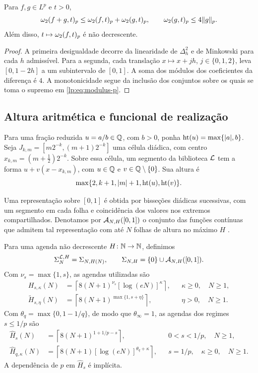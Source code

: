 \documentclass[12pt,a4paper]{article}
\begin{document}
\begin{lema}
\label{lp:lem:modulus}
Para $f,g\in L^p$ e $t>0$,
\[
 \omega_2(f+g,t)_{p}\le\omega_2(f,t)_{p}+\omega_2(g,t)_{p},
 \qquad \omega_2(g,t)_{p}\le4\|g\|_p.
\]
Além disso, $t\mapsto\omega_2(f,t)_{p}$ é não decrescente.
\end{lema}

\begin{proof}
A primeira desigualdade decorre da linearidade de $\Delta_h^2$ e de Minkowski para cada $h$ admissível. Para a segunda, cada translação $x\mapsto x+jh$, $j\in\{0,1,2\}$, leva $[0,1-2h]$ a um subintervalo de $[0,1]$. A soma dos módulos dos coeficientes da diferença é $4$. A monotonicidade segue da inclusão dos conjuntos sobre os quais se toma o supremo em \eqref{lp:eq:modulus-p}.
\end{proof}

\subsection{Altura aritmética e funcional de realização}

Para uma fração reduzida $u=a/b\in\mathbb Q$, com $b>0$, ponha
$\operatorname{ht}(u)=\max\{|a|,b\}$. Seja $J_{k,m}=[m2^{-k},(m+1)2^{-k}]$ uma célula diádica, com centro $x_{k,m}=(m+\tfrac12)2^{-k}$. Sobre essa célula, um segmento da biblioteca $\mathcal L$ tem a forma $u+v(x-x_{k,m})$, com $u\in\mathbb Q$ e $v\in\mathbb Q\setminus\{0\}$. Sua altura é
\[
 \max\{2,k+1,|m|+1,\operatorname{ht}(u),\operatorname{ht}(v)\}.
\]

Uma representação sobre $[0,1]$ é obtida por bisseções diádicas sucessivas, com um segmento em cada folha e coincidência dos valores nos extremos compartilhados. Denotamos por $\mathcal A_{N,H}([0,1])$ o conjunto das funções contínuas que admitem tal representação com até $N$ folhas de altura no máximo $H$ \citep{lp-oliveiravol}.

Para uma agenda não decrescente $H\colon\mathbb N\to\mathbb N$, definimos
\begin{equation}
 \Sigma_{N}^{\mathcal L,H}=\Sigma_{N,H(N)},\qquad \Sigma_{N,H}=\{0\}\cup\mathcal A_{N,H}([0,1]).
 \label{lp:eq:sigma}
\end{equation}
Com $\nu_s=\max\{1,s\}$, as agendas utilizadas são
\begin{align}
 H_{s,\kappa}(N)
 &=\left\lceil8(N+1)^{\nu_s}[\log(eN)]^\kappa\right\rceil,
 &&\kappa\ge0,\quad N\ge1,\label{lp:eq:schedule}\\
 \widetilde H_{s,\eta}(N)
 &=\left\lceil8(N+1)^{\max\{1,s+\eta\}}\right\rceil,
 &&\eta>0,\quad N\ge1.\label{lp:eq:slack}
\end{align}
Com $\theta_q=\max\{0,1-1/q\}$, de modo que $\theta_\infty=1$, as agendas dos regimes $s\le1/p$ são
\begin{align}
 \widehat H_{s}(N)
 &=\left\lceil8(N+1)^{1+1/p-s}\right\rceil,
 &&0<s<1/p,\quad N\ge1,\label{lp:eq:schedule-low}\\
 \widehat H_{q,\kappa}(N)
 &=\left\lceil8(N+1)[\log(eN)]^{\theta_q+\kappa}\right\rceil,
 &&s=1/p,\quad\kappa\ge0,\quad N\ge1.\label{lp:eq:schedule-diag}
\end{align}
A dependência de $p$ em $\widehat H_s$ é implícita.
\end{document}
